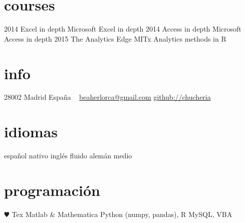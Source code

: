 \documentclass[]{friggeri-cv}
\begin{document}
\section{courses}

\begin{entrylist}
  \entry
    {2014}
    {Excel in depth}
    {}
    {Microsoft Excel in depth}
  \entry
    {2014}
    {Access in depth}
    {}
    {Microsoft Access in depth}
  \entry
    {2015}
    {The Analytics Edge}
    {MITx}
    {Analytics methods in R}
\end{entrylist}




\else 

       {}


\begin{aside}
  \section{info}
    28002 Madrid
    España
    ~
    \href{mailto:beaherlorca@gmail.com}{beaherlorca@gmail.com}
    \href{https://github.com/chucheria}{github://chucheria}
  \section{idiomas}
    español nativo
    inglés fluido
    alemán medio
  \section{programación}
    {\color{red} $\varheartsuit$} Tex
    Matlab \& Mathematica
    Python (numpy, pandas), R
    MySQL, VBA
\end{aside}
\end{document}
